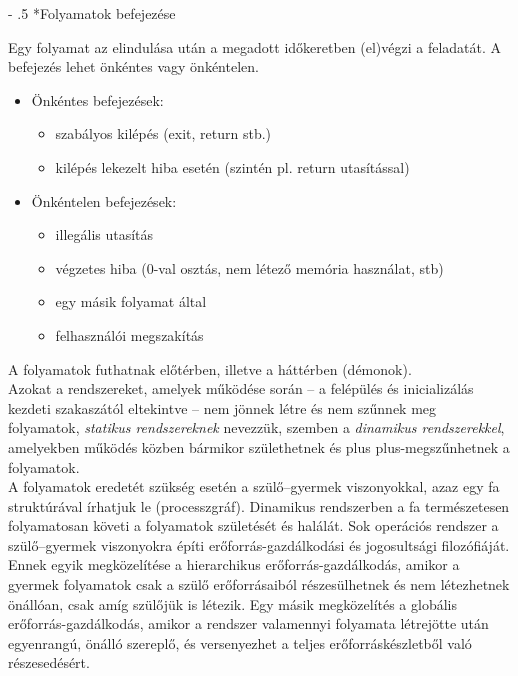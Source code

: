 \documentclass[tikz,12pt,margin=0px]{article}
\makeatletter
\renewcommand\paragraph{%
	\@startsection{paragraph}{4}{0mm}%
	{-\baselineskip}%
	{.5\baselineskip}%
	{\normalfont\normalsize\bfseries}}
\newcommand\lword[1]{\leavevmode\nobreak\hskip0pt plus\linewidth\penalty50\hskip0pt plus-\linewidth\nobreak #1}
\makeatother
\begin{document}
	\paragraph*{Folyamatok befejezése}

    Egy folyamat az elindulása után a megadott időkeretben (el)végzi a feladatát. A befejezés lehet önkéntes vagy önkéntelen.
	\begin{itemize}[topsep=8pt,itemsep=4pt,partopsep=4pt, parsep=4pt]
        \item Önkéntes befejezések:
        \begin{itemize}
            \item szabályos kilépés (exit, return stb.)
            \item kilépés lekezelt hiba esetén (szintén pl. return utasítással)
        \end{itemize}
        \item Önkéntelen befejezések:
        \begin{itemize}
            \item illegális utasítás
            \item végzetes hiba (0-val osztás, nem létező memória használat, stb)
            \item egy másik folyamat által
            \item felhasználói megszakítás
        \end{itemize}
	\end{itemize}

    \noindent A folyamatok futhatnak előtérben, illetve a háttérben (démonok).\\

    \noindent Azokat a rendszereket, amelyek működése során – a felépülés és inicializálás kezdeti szakaszától eltekintve – nem jönnek létre és nem szűnnek meg folyamatok, \emph{statikus rendszereknek} nevezzük, szemben a \emph{dinamikus rendszerekkel}, amelyekben működés közben bármikor születhetnek és \lword{megszűnhetnek} a folyamatok.\\

    \noindent A folyamatok eredetét szükség esetén a szülő–gyermek viszonyokkal, azaz egy fa struktúrával írhatjuk le (processzgráf). Dinamikus rendszerben a fa természetesen folyamatosan követi a folyamatok születését és halálát. Sok operációs rendszer a szülő–gyermek viszonyokra építi erőforrás-gazdálkodási és jogosultsági filozófiáját. Ennek egyik megközelítése a hierarchikus erőforrás-gazdálkodás, amikor a gyermek folyamatok csak a szülő erőforrásaiból részesülhetnek és nem létezhetnek önállóan, csak amíg szülőjük is létezik. Egy másik megközelítés a globális erőforrás-gazdálkodás, amikor a rendszer valamennyi folyamata létrejötte után egyenrangú, önálló szereplő, és versenyezhet a teljes erőforráskészletből való részesedésért.
\end{document}
